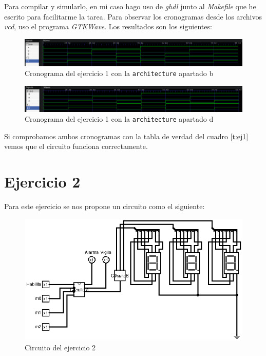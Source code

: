 \documentclass[a4paper,titlepage]{article}
\begin{document}
			Para compilar y simularlo, en mi caso hago uso de \textit{ghdl} junto al \textit{Makefile} que he 
			escrito para facilitarme la tarea. Para observar los cronogramas desde los archivos \textit{vcd}, 
			uso el programa \textit{GTKWave}. Los resultados son los siguientes:\\
			\begin{figure}[ht]
				\centering
				\includegraphics[width=\textwidth]{../Ejercicio1/wave/gtkwave_ej1_comportamiento.png}
				\caption{Cronograma del ejercicio 1 con la \texttt{architecture} apartado b}
				\label{f:ej1_comportamiento}
			\end{figure}
			\begin{figure}[ht]
				\centering
				\includegraphics[width=\textwidth]{../Ejercicio1/wave/gtkwave_ej1_estructura.png}
				\caption{Cronograma del ejercicio 1 con la \texttt{architecture} apartado d}
				\label{f:ej1_estructura}
			\end{figure}

			Si comprobamos ambos cronogramas con la tabla de verdad del cuadro \ref{t:ej1} vemos que el
			circuito funciona correctamente.
		
			\newpage
		
		\section{Ejercicio 2}
			Para este ejercicio se nos propone un circuito como el siguiente:\\
			\begin{figure}[h!]
				\includegraphics[width=\textwidth]{../Ejercicio2/circuitos/circuito_principal.png}
				\caption{Circuito del ejercicio 2}
				\label{f:ej2}
			\end{figure}
\end{document}
